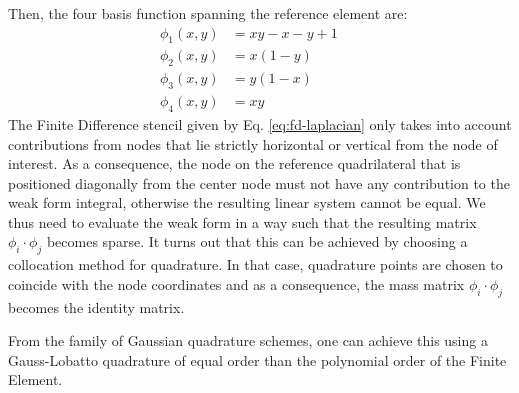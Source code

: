 \documentclass[sn-mathphys,Numbered]{sn-jnl}%
\theoremstyle{thmstyleone}%
\theoremstyle{thmstyletwo}%
\theoremstyle{thmstylethree}%
\begin{document}
Then, the four basis function spanning the reference element are:
\begin{align}
    \phi_1(x,y) &= xy - x - y + 1 &&\\
    \phi_2(x,y) &= x (1 - y) &&\\
    \phi_3(x,y) &= y (1 - x) &&\\
    \phi_4(x,y) &= x y &&
\end{align}
The Finite Difference stencil given by Eq. \ref{eq:fd-laplacian} only takes into account contributions from nodes that lie strictly horizontal or vertical from the node of interest.
As a consequence, the node on the reference quadrilateral that is positioned diagonally from the center node must not have any contribution to the weak form integral, otherwise the resulting linear system cannot be equal.
We thus need to evaluate the weak form in a way such that the resulting matrix $\phi_i \cdot \phi_j$ becomes sparse.
It turns out that this can be achieved by choosing a collocation method for quadrature.
In that case, quadrature points are chosen to coincide with the node coordinates and as a consequence, the mass matrix $\phi_i \cdot \phi_j$ becomes the identity matrix.

From the family of Gaussian quadrature schemes, one can achieve this using a Gauss-Lobatto quadrature of equal order than the polynomial order of the Finite Element.
\end{document}
